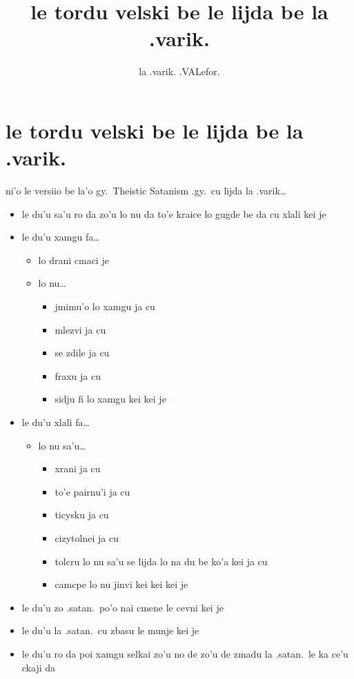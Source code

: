 \documentclass{article}
\title{le tordu velski be le lijda be la .varik.}
\author{la .varik. .VALefor.}
\begin{document}
\maketitle

\section{le tordu velski be le lijda be la .varik.}

ni'o le versiio be la'o gy.\ Theistic Satanism .gy.\ cu lijda la .varik\ldots

\begin{itemize}
	\item le du'u sa'u ro da zo'u lo nu da to'e kraice lo gugde be da cu xlali kei je
	\item le du'u xamgu fa\ldots{}
	\begin{itemize}
		\item lo drani cmaci je
		\item lo nu\ldots{}
		\begin{itemize}
			\item jmimu'o lo xamgu ja cu
			\item mlezvi ja cu
			\item se zdile ja cu
			\item fraxu ja cu
			\item sidju fi lo xamgu kei kei je
		\end{itemize}
	\end{itemize}
	\item le du'u xlali fa\ldots{}

	\begin{itemize}
		\item lo nu sa'u\ldots{}
		\begin{itemize}
			\item xrani ja cu
			\item to'e pairnu'i ja cu
			\item ticysku ja cu
			\item cizytolnei ja cu
			\item tolcru lo nu sa'u se lijda lo na du be ko'a kei ja cu
			\item camcpe lo nu jinvi kei kei kei je
		\end{itemize}
	\end{itemize}
	\item le du'u zo .satan.\ po'o nai cmene le cevni kei je
	\item le du'u la .satan.\ cu zbasu le munje kei je
	\item le du'u ro da poi xamgu selkai zo'u no de zo'u de zmadu la .satan.\ le ka ce'u ckaji da
\end{itemize}
\end{document}
